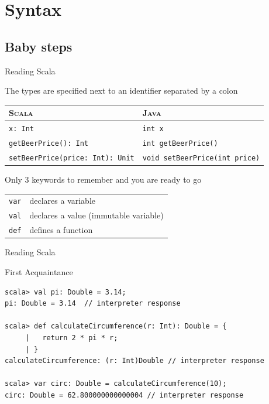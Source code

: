 
\section{Syntax}
\subsection{Baby steps}
\begin{frame}[fragile]{Reading Scala}
\begin{block}{The types are specified next to an identifier separated by a colon}
\begin{tabular}{l|l}
\textsc{Scala} & \textsc{Java}\\
\hline
\lstinline!x: Int! & \lstinline!int x!\\
\lstinline!getBeerPrice(): Int! & \lstinline!int getBeerPrice()!\\
\lstinline!setBeerPrice(price: Int): Unit! & \lstinline!void setBeerPrice(int price)!\\
\end{tabular}
\end{block}
\pause
\begin{block}{Only 3 keywords to remember and you are ready to go}
\begin{tabular}{ll}
\lstinline!var! & declares a variable\\
\lstinline!val! & declares a value (immutable variable)\\
\lstinline!def! & defines a function \\
\end{tabular}
\end{block}
\end{frame}

\begin{frame}[fragile]{Reading Scala}
\begin{exampleblock}{First Acquaintance}
\begin{lstlisting}
scala> val pi: Double = 3.14;
pi: Double = 3.14  // interpreter response

scala> def calculateCircumference(r: Int): Double = {
     |   return 2 * pi * r;
     | }
calculateCircumference: (r: Int)Double // interpreter response

scala> var circ: Double = calculateCircumference(10);
circ: Double = 62.800000000000004 // interpreter response
\end{lstlisting}
\end{exampleblock}
\end{frame}

